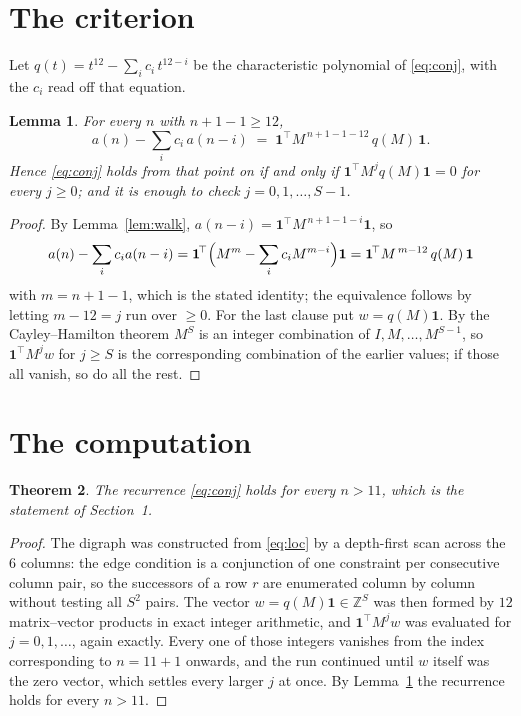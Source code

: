 \documentclass[11pt,a4paper]{article}
\theoremstyle{plain}
\newtheorem{theorem}{Theorem}
\newtheorem{lemma}[theorem]{Lemma}
\theoremstyle{definition}
\begin{document}
\section{The criterion}

Let $q(t)=t^{12}-\sum_i c_i\,t^{12-i}$ be the characteristic polynomial of
\eqref{eq:conj}, with the $c_i$ read off that equation.

\begin{lemma}\label{lem:crit}
For every $n$ with $n+1-1\ge12$,
\[
a(n)-\sum_i c_i\,a(n-i)\;=\;\mathbf{1}^{\!\top}M^{\,n+1-1-12}\,q(M)\,\mathbf{1} .
\]
Hence \eqref{eq:conj} holds from that point on if and only if
$\mathbf{1}^{\!\top}M^{j}q(M)\mathbf{1}=0$ for every $j\ge0$; and it is enough to check
$j=0,1,\dots,S-1$.
\end{lemma}

\begin{proof}
By Lemma~\ref{lem:walk}, $a(n-i)=\mathbf{1}^{\!\top}M^{\,n+1-1-i}\mathbf{1}$, so
\[
a(n)-\sum_i c_i a(n-i)
=\mathbf{1}^{\!\top}\Bigl(M^{m}-\sum_i c_i M^{m-i}\Bigr)\mathbf{1}
=\mathbf{1}^{\!\top}M^{\,m-12}\,q(M)\,\mathbf{1}
\]
with $m=n+1-1$, which is the stated identity; the equivalence follows by letting
$m-12=j$ run over $\ge0$. For the last clause put $w=q(M)\mathbf{1}$. By the
Cayley--Hamilton theorem $M^{S}$ is an integer combination of $I,M,\dots,M^{S-1}$, so
$\mathbf{1}^{\!\top}M^{j}w$ for $j\ge S$ is the corresponding combination of the earlier
values; if those all vanish, so do all the rest.
\end{proof}

\section{The computation}

\begin{theorem}
The recurrence \eqref{eq:conj} holds for every $n>11$, which is the statement of
Section~1.
\end{theorem}

\begin{proof}
The digraph was constructed from \eqref{eq:loc} by a depth-first scan across the $6$
columns: the edge condition is a conjunction of one constraint per consecutive column
pair, so the successors of a row $r$ are enumerated column by column without testing all
$S^2$ pairs. The vector $w=q(M)\mathbf{1}\in\mathbb{Z}^{S}$ was then formed by $12$
matrix--vector products in exact integer arithmetic, and $\mathbf{1}^{\!\top}M^{j}w$ was
evaluated for $j=0,1,\dots$, again exactly. Every one of those integers vanishes from the
index corresponding to $n=11+1$ onwards, and the run continued until $w$ itself was the
zero vector, which settles every larger $j$ at once. By Lemma~\ref{lem:crit} the recurrence
holds for every $n>11$.
\end{proof}
\end{document}
